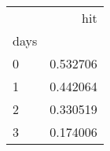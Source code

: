 \begin{tabular}{lr}
\toprule
{} &       hit \\
days &           \\
\midrule
0    &  0.532706 \\
1    &  0.442064 \\
2    &  0.330519 \\
3    &  0.174006 \\
\bottomrule
\end{tabular}
